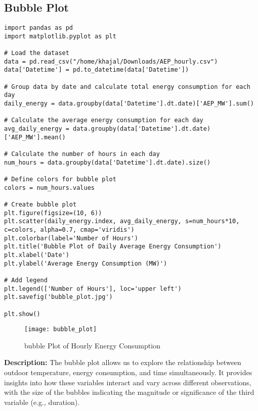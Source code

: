 \documentclass{article}
\begin{document}
\subsection{ Bubble Plot}
\begin{lstlisting}[caption={Python code for Bubble plot}]
import pandas as pd
import matplotlib.pyplot as plt

# Load the dataset
data = pd.read_csv("/home/khajal/Downloads/AEP_hourly.csv")
data['Datetime'] = pd.to_datetime(data['Datetime'])

# Group data by date and calculate total energy consumption for each day
daily_energy = data.groupby(data['Datetime'].dt.date)['AEP_MW'].sum()

# Calculate the average energy consumption for each day
avg_daily_energy = data.groupby(data['Datetime'].dt.date)['AEP_MW'].mean()

# Calculate the number of hours in each day
num_hours = data.groupby(data['Datetime'].dt.date).size()

# Define colors for bubble plot
colors = num_hours.values

# Create bubble plot
plt.figure(figsize=(10, 6))
plt.scatter(daily_energy.index, avg_daily_energy, s=num_hours*10, c=colors, alpha=0.7, cmap='viridis')
plt.colorbar(label='Number of Hours')
plt.title('Bubble Plot of Daily Average Energy Consumption')
plt.xlabel('Date')
plt.ylabel('Average Energy Consumption (MW)')

# Add legend
plt.legend(['Number of Hours'], loc='upper left')
plt.savefig('bubble_plot.jpg')

plt.show()
\end{lstlisting}
\begin{figure}[H]
    \centering
    \texttt{[image: bubble\_plot]}
    \caption{bubble Plot of Hourly Energy Consumption}
    \label{fig:bubble_plot}
\end{figure}
\textbf{Description:}
The bubble plot allows us to explore the relationship between outdoor temperature, energy consumption, and time simultaneously. It provides insights into how these variables interact and vary across different observations, with the size of the bubbles indicating the magnitude or significance of the third variable (e.g., duration).
\end{document}
